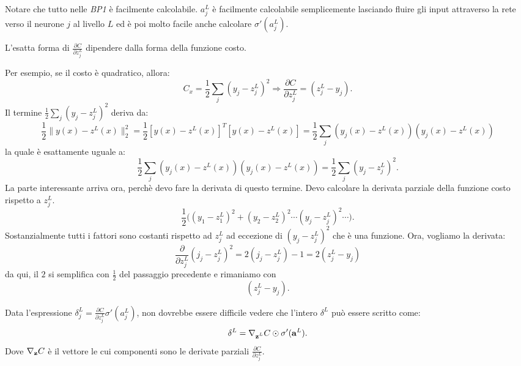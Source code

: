 Notare che tutto nelle \textit{BP1} è facilmente calcolabile. $a_j^L$ è facilmente calcolabile semplicemente lasciando fluire gli input attraverso la rete verso il neurone $j$ al livello $L$ ed è poi molto facile anche calcolare $\sigma'(a^L_j)$.



L'esatta forma di $\frac{\partial C}{\partial z_j^L}$ dipendere dalla forma della funzione costo. 


Per esempio, se il costo è quadratico, allora:
\begin{equation}
    C_x=\frac{1}{2}\sum_j(y_j - z^L_j)^2\Rightarrow \frac{\partial C}{\partial z^L_j} = (z^L_j - y_j).
\end{equation}
Il termine $\frac{1}{2}\sum_j(y_j - z^L_j)^2$ deriva da:
\begin{equation}
    \frac{1}{2}\|y(x)-z^L(x)\|^2_2=
    \frac{1}{2}[y(x)-z^L(x)]^T[y(x)-z^L(x)]=\frac{1}{2}\sum_j(y_j(x)-z^L(x))(y_j(x)-z^L(x))
\end{equation}
la quale è esattamente uguale a:
\begin{equation}
    \frac{1}{2}\sum_j(y_j(x)-z^L(x))(y_j(x)-z^L(x))=\frac{1}{2}\sum_j(y_j - z^L_j)^2.
\end{equation}
La parte interessante arriva ora, perchè devo fare la derivata di questo termine. Devo calcolare la derivata parziale della funzione costo rispetto a $z^L_j$.
\begin{equation}
    \frac{1}{2}\Big((y_1-z^L_1)^2+(y_2-z^L_2)^2\cdots(y_j-z^L_j)^2\cdots\Big).
\end{equation}
Sostanzialmente tutti i fattori sono costanti rispetto ad $z^L_j$ ad eccezione di $(y_j-z^L_j)^2$ che è una funzione. Ora, vogliamo la derivata:
\begin{equation}
    \frac{\partial}{\partial z^L_j} (j_j-z^L_j)^2=2(j_j-z^L_j)-1=2(z_j^L-y_j)
\end{equation}
da qui, il $2$ si semplifica con $\frac{1}{2}$ del passaggio precedente e rimaniamo con
\begin{equation}
    (z^L_j - y_j).
\end{equation}



Data l'espressione $\delta^L_j=\frac{\partial C}{\partial z^L_j}\sigma'(a^L_j)$, non dovrebbe essere difficile vedere che l'intero $\delta^L$ può essere scritto come:
\begin{equation}
    \delta^L=\nabla_\text{\textbf{z$^L$}}C\odot\sigma'(\text{\textbf{a}}^L).
\end{equation}
Dove $\nabla_\text{\textbf{z}}C$ è il vettore le cui componenti sono le derivate parziali $\frac{\partial C}{\partial z^L_j}$.
\newpage
